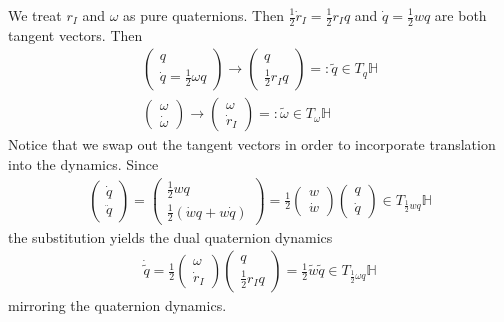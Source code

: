 \documentclass[12pt,class=article,crop=false]{standalone}
\begin{document}
We treat $ r_I$ and $ \omega$ as pure quaternions. Then $\frac{1}{2}\dot{r}_I = \frac{1}{2} r_I q $ and $\dot{q} = \frac{1}{2}wq$ are both tangent vectors. Then
\begin{align*}
	\begin{pmatrix} q\\ \dot{q} = \frac{1}{2} \omega q \end{pmatrix}  \to \begin{pmatrix} q\\ \frac{1}{2} r_I q \end{pmatrix} =: \widetilde{ q} \in T_q \mathbb{H}\\
	\begin{pmatrix} \omega \\ \dot{\omega} \end{pmatrix} \to \begin{pmatrix} \omega \\ \dot{r}_I \end{pmatrix} =: \widetilde{ \omega} \in T_{ \omega} \mathbb{H} 
\end{align*}
Notice that we swap out the tangent vectors in order to incorporate translation into the dynamics. Since
\begin{align*}
	\begin{pmatrix} \dot{q}\\ \ddot{q} \end{pmatrix} = \begin{pmatrix} \frac{1}{2} wq \\ \frac{1}{2} \left( \dot{w}q + w\dot{q} \right)  \end{pmatrix}  = \frac{1}{2} \begin{pmatrix} w\\ \dot{w} \end{pmatrix} \begin{pmatrix} q\\ \dot{q} \end{pmatrix} \in T_{\frac{1}{2}wq} \mathbb{H}
\end{align*}
the substitution yields the dual quaternion dynamics
\begin{align*}
	\dot{\widetilde{ q}} = \frac{1}{2} \begin{pmatrix} \omega\\ \dot{r}_I \end{pmatrix} \begin{pmatrix} q\\ \frac{1}{2} r_I q \end{pmatrix} = \frac{1}{2} \widetilde{ w} \widetilde{ q} \in T_{\frac{1}{2}\omega q} \mathbb{H}
\end{align*}
mirroring the quaternion dynamics.
\end{document}
